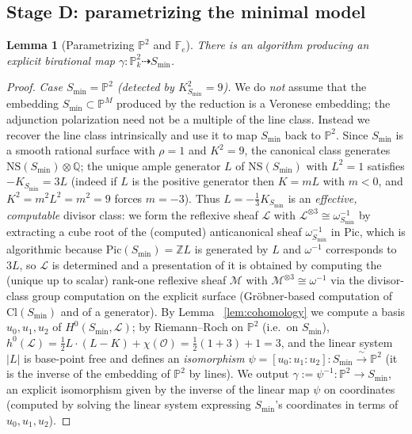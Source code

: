 \documentclass{amsart}
\theoremstyle{plain}
\newtheorem{lemma}{Lemma}
\theoremstyle{definition}
\newcommand{\PP}{\mathbb{P}}
\newcommand{\cO}{\mathcal{O}}
\begin{document}
\subsection{Stage D: parametrizing the minimal model}

\begin{lemma}[Parametrizing $\PP^2$ and $\mathbb F_e$]\label{lem:param-min}
There is an algorithm producing an explicit birational map
$\gamma\colon\PP^2_k\dashrightarrow S_{\min}$.
\end{lemma}

\begin{proof}
\emph{Case $S_{\min}=\PP^2$ (detected by $K_{S_{\min}}^2=9$).}  We do
\emph{not} assume that the embedding $S_{\min}\subset\PP^M$ produced by the
reduction is a Veronese embedding; the adjunction polarization need not be a
multiple of the line class.  Instead we recover the line class intrinsically and
use it to map $S_{\min}$ back to $\PP^2$.  Since $S_{\min}$ is a smooth rational
surface with $\rho=1$ and $K^2=9$, the canonical class generates
$\mathrm{NS}(S_{\min})\otimes\mathbb Q$; the unique ample generator $L$ of
$\mathrm{NS}(S_{\min})$ with $L^2=1$ satisfies $-K_{S_{\min}}=3L$ (indeed if $L$
is the positive generator then $K=mL$ with $m<0$, and $K^2=m^2L^2=m^2=9$ forces
$m=-3$).  Thus $L=-\tfrac13 K_{S_{\min}}$ is an \emph{effective, computable}
divisor class: we form the reflexive sheaf $\mathcal L$ with
$\mathcal L^{\otimes3}\cong\omega_{S_{\min}}^{-1}$ by extracting a cube root of
the (computed) anticanonical sheaf $\omega_{S_{\min}}^{-1}$ in $\mathrm{Pic}$,
which is algorithmic because $\mathrm{Pic}(S_{\min})=\mathbb ZL$ is generated by
$L$ and $\omega^{-1}$ corresponds to $3L$, so $\mathcal L$ is determined and a
presentation of it is obtained by computing the (unique up to scalar) rank-one
reflexive sheaf $\mathcal M$ with $\mathcal M^{\otimes 3}\cong\omega^{-1}$ via
the divisor-class group computation on the explicit surface (Gr\"obner-based
computation of $\mathrm{Cl}(S_{\min})$ and of a generator).  By Lemma~%
\ref{lem:cohomology} we compute a basis $u_0,u_1,u_2$ of
$H^0(S_{\min},\mathcal L)$; by Riemann--Roch on $\PP^2$ (i.e.\ on $S_{\min}$),
$h^0(\mathcal L)=\tfrac12 L\cdot(L-K)+\chi(\cO)=\tfrac12(1+3)+1=3$, and the
linear system $|L|$ is base-point free and defines an \emph{isomorphism}
$\psi=[u_0:u_1:u_2]\colon S_{\min}\xrightarrow{\ \sim\ }\PP^2$ (it is the
inverse of the embedding of $\PP^2$ by lines).  We output
$\gamma:=\psi^{-1}\colon\PP^2\to S_{\min}$, an explicit isomorphism given by the
inverse of the linear map $\psi$ on coordinates (computed by solving the linear
system expressing $S_{\min}$'s coordinates in terms of $u_0,u_1,u_2$).


\end{proof}
\end{document}
